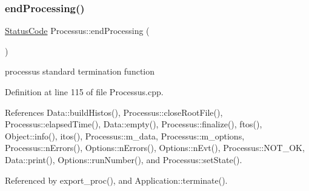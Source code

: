 \subsubsection{\texorpdfstring{end\+Processing()}{endProcessing()}}
{\footnotesize\ttfamily \hyperlink{classStatusCode}{Status\+Code} Processus\+::end\+Processing (\begin{DoxyParamCaption}{ }\end{DoxyParamCaption})\hspace{0.3cm}{\ttfamily [inherited]}}

processus standard termination function 

Definition at line 115 of file Processus.\+cpp.



References Data\+::build\+Histos(), Processus\+::close\+Root\+File(), Processus\+::elapsed\+Time(), Data\+::empty(), Processus\+::finalize(), ftos(), Object\+::info(), itos(), Processus\+::m\+\_\+data, Processus\+::m\+\_\+options, Processus\+::n\+Errors(), Options\+::n\+Errors(), Options\+::n\+Evt(), Processus\+::\+N\+O\+T\+\_\+\+OK, Data\+::print(), Options\+::run\+Number(), and Processus\+::set\+State().



Referenced by export\+\_\+proc(), and Application\+::terminate().



